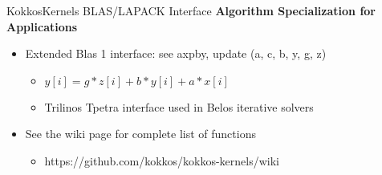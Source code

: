 \begin{frame}[fragile]{KokkosKernels BLAS/LAPACK Interface}
  \textbf{Algorithm Specialization for Applications}
  \begin{itemize}
    \item Extended Blas 1 interface: see axpby, update (a, c, b, y, g, z)
    \begin{itemize}
      \item $y[i] = g*z[i] + b*y[i] + a*x[i]$
      \item Trilinos Tpetra interface used in Belos iterative solvers
    \end{itemize}
    \item See the wiki page for complete list of functions
    \begin{itemize}
      \item https://github.com/kokkos/kokkos-kernels/wiki
    \end{itemize}
  \end{itemize}
  \vspace{10pt}
  \begin{center}
  \end{center}
\end{frame}

